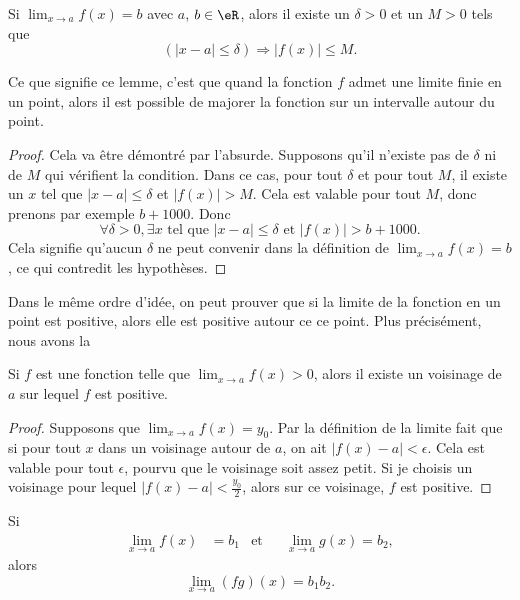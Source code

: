 \begin{lemma}       \label{LemLimMajorableVois}
	Si $\lim_{x\to a}f(x)=b$ avec $a$, $b\in\eR$, alors il existe un $\delta>0$ et un $M>0$ tels que
	\[
		(| x-a |\leq\delta)\Rightarrow | f(x) |\leq M.
	\]
\end{lemma}

Ce que signifie ce lemme, c'est que quand la fonction $f$ admet une limite finie en un point, alors il est possible de majorer la fonction sur un intervalle autour du point.

\begin{proof}
	Cela va être démontré par l'absurde. Supposons qu'il n'existe pas de $\delta$ ni de $M$ qui vérifient la condition. Dans ce cas, pour tout $\delta$ et pour tout $M$, il existe un $x$ tel que $| x-a |\leq\delta$ et $| f(x) |> M$. Cela est valable pour tout $M$, donc prenons par exemple $b+1000$. Donc
	\begin{equation}
		\forall\delta>0,\exists x\text{ tel que } | x-a |\leq\delta\text{ et }| f(x) |>b+1000.
	\end{equation}
	Cela signifie qu'aucun $\delta$ ne peut convenir dans la définition de $\lim_{x\to a}f(x)=b$, ce qui contredit les hypothèses.
\end{proof}

Dans le même ordre d'idée, on peut prouver que si la limite de la fonction en un point est positive, alors elle est positive autour ce ce point. Plus précisément, nous avons la
\begin{proposition} \label{PropoLimPosFPos}
	Si $f$ est une fonction telle que $\lim_{x\to a}f(x)>0$, alors il existe un voisinage de $a$ sur lequel $f$ est positive.
\end{proposition}

\begin{proof}
	Supposons que $\lim_{x\to a}f(x)=y_0$. Par la définition de la limite fait que si pour tout $x$ dans un voisinage autour de $a$, on ait $| f(x)-a |<\epsilon$. Cela est valable pour tout $\epsilon$, pourvu que le voisinage soit assez petit. Si je choisis un voisinage pour lequel $| f(x)-a |<\frac{ y_0 }{ 2 }$, alors sur ce voisinage, $f$ est positive.
\end{proof}

\begin{theorem}     \label{Tholimfgabab}
	Si
	\begin{align}
		\lim_{x\to a}f(x) & =b_1 & \text{et} &  & \lim_{x\to a}g(x)=b_2,
	\end{align}
	alors
	\begin{equation}
		\lim_{x\to a}(fg)(x)=b_1b_2.
	\end{equation}
\end{theorem}

